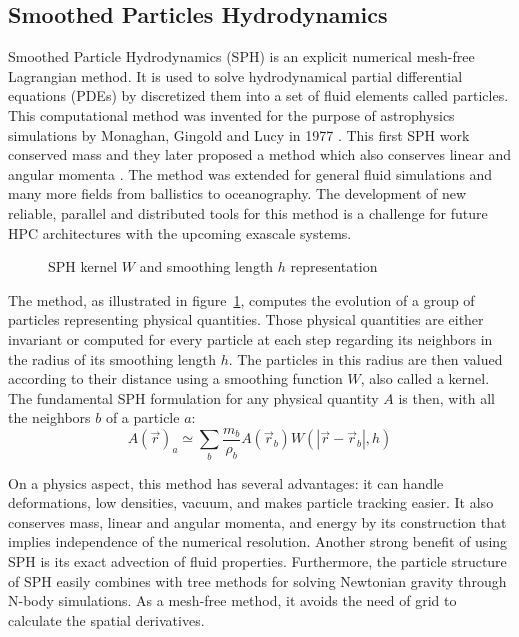 \subsection{Smoothed Particles Hydrodynamics}
\label{sec:intro_sph}
Smoothed Particle Hydrodynamics (SPH) is an explicit numerical mesh-free Lagrangian method.
It is used to solve hydrodynamical partial differential equations (PDEs) by discretized them into a set of fluid elements called particles. 
This computational method was invented for the purpose of astrophysics simulations by Monaghan, Gingold and Lucy in 1977 \cite{lucy1977numerical,gingold1977smoothed}. 
This first SPH work conserved mass and they later proposed a method which also conserves linear and angular momenta \cite{gingold1982kernel}. 
The method was extended for general fluid simulations and many more fields from ballistics to oceanography.
The development of new reliable, parallel and distributed tools for this method is a challenge for future HPC architectures with the upcoming exascale systems.

%
\begin{figure}
\centering

\caption{SPH kernel $W$ and smoothing length $h$ representation}
\label{fig:sph_base}
\end{figure}
%
The method, as illustrated in figure~\ref{fig:sph_base}, computes the evolution of a group of particles representing physical quantities.
Those physical quantities are either invariant or computed for every particle at each step regarding its neighbors in the radius of its smoothing length $h$. 
The particles in this radius are then valued according to their distance using a smoothing function $W$, also called a kernel. 
The fundamental SPH formulation for any physical quantity $A$ is then, with all the neighbors $b$ of a particle $a$:
\begin{equation}
A(\vec{r})_a \simeq \sum_b \frac{m_b}{\rho_b} A(\vec{r}_b) W ( |\vec{r}-\vec{r}_b|,h)
\end{equation}

On a physics aspect, this method has several advantages:
it can handle deformations, low densities, vacuum, and makes particle tracking easier. 
It also conserves mass, linear and angular momenta, and energy by its construction that implies independence of the numerical resolution. 
Another strong benefit of using SPH is its exact advection of fluid properties. 
Furthermore, the particle structure of SPH easily combines with tree methods for solving Newtonian gravity through N-body simulations.
As a mesh-free method, it avoids the need of grid to calculate the spatial derivatives. 


